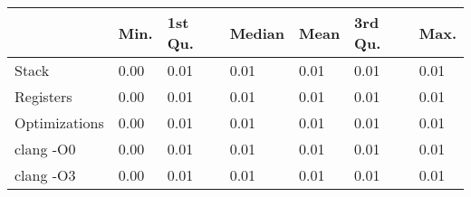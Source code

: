 \begin{table}[ht]
\centering
\begin{tabular}{p{}p{}p{}p{}p{}p{}p{}}
  \hline
 & Min. & 1st Qu. & Median & Mean & 3rd Qu. & Max. \\ 
  \hline
Stack & 0.00 & 0.01 & 0.01 & 0.01 & 0.01 & 0.01 \\ 
  Registers & 0.00 & 0.01 & 0.01 & 0.01 & 0.01 & 0.01 \\ 
  Optimizations & 0.00 & 0.01 & 0.01 & 0.01 & 0.01 & 0.01 \\ 
  clang -O0 & 0.00 & 0.01 & 0.01 & 0.01 & 0.01 & 0.01 \\ 
  clang -O3 & 0.00 & 0.01 & 0.01 & 0.01 & 0.01 & 0.01 \\ 
   \hline
\end{tabular}
\end{table}
